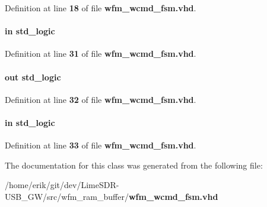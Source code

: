 Definition at line {\bf 18} of file {\bf wfm\+\_\+wcmd\+\_\+fsm.\+vhd}.

\paragraph[{wfm\+\_\+load}]{ {\bfseries \textcolor{keywordflow}{in}\textcolor{vhdlchar}{ }} {\bfseries \textcolor{comment}{std\+\_\+logic}\textcolor{vhdlchar}{ }} \hspace{0.3cm}{\ttfamily [Port]}}\label{classwfm__wcmd__fsm_a3d169846da42e9b1a5f04bce97dd2fff}


Definition at line {\bf 31} of file {\bf wfm\+\_\+wcmd\+\_\+fsm.\+vhd}.

\paragraph[{wfm\+\_\+load\+\_\+ext}]{ {\bfseries \textcolor{keywordflow}{out}\textcolor{vhdlchar}{ }} {\bfseries \textcolor{comment}{std\+\_\+logic}\textcolor{vhdlchar}{ }} \hspace{0.3cm}{\ttfamily [Port]}}\label{classwfm__wcmd__fsm_ac33c4f48f9241443d7d6c4d199620377}


Definition at line {\bf 32} of file {\bf wfm\+\_\+wcmd\+\_\+fsm.\+vhd}.

\paragraph[{wfm\+\_\+play\+\_\+stop}]{ {\bfseries \textcolor{keywordflow}{in}\textcolor{vhdlchar}{ }} {\bfseries \textcolor{comment}{std\+\_\+logic}\textcolor{vhdlchar}{ }} \hspace{0.3cm}{\ttfamily [Port]}}\label{classwfm__wcmd__fsm_aec820bcf21fff0d393f59c1e0478385c}


Definition at line {\bf 33} of file {\bf wfm\+\_\+wcmd\+\_\+fsm.\+vhd}.



The documentation for this class was generated from the following file\+:\begin{DoxyCompactItemize}
\item 
/home/erik/git/dev/\+Lime\+S\+D\+R-\/\+U\+S\+B\+\_\+\+G\+W/src/wfm\+\_\+ram\+\_\+buffer/{\bf wfm\+\_\+wcmd\+\_\+fsm.\+vhd}\end{DoxyCompactItemize}
